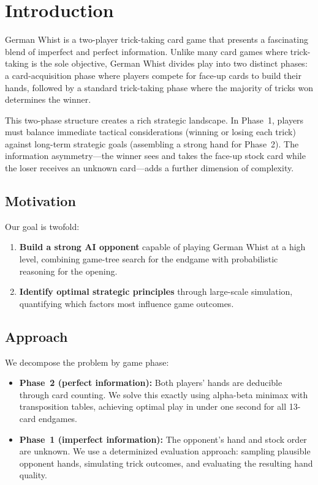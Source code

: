 \section{Introduction}
\label{sec:introduction}

German Whist is a two-player trick-taking card game that presents a fascinating
blend of imperfect and perfect information. Unlike many card games where
trick-taking is the sole objective, German Whist divides play into two distinct
phases: a card-acquisition phase where players compete for face-up cards to
build their hands, followed by a standard trick-taking phase where the majority
of tricks won determines the winner.

This two-phase structure creates a rich strategic landscape. In Phase~1, players
must balance immediate tactical considerations (winning or losing each trick)
against long-term strategic goals (assembling a strong hand for Phase~2). The
information asymmetry---the winner sees and takes the face-up stock card while
the loser receives an unknown card---adds a further dimension of complexity.

\subsection{Motivation}

Our goal is twofold:
\begin{enumerate}
  \item \textbf{Build a strong AI opponent} capable of playing German Whist at
    a high level, combining game-tree search for the endgame with probabilistic
    reasoning for the opening.
  \item \textbf{Identify optimal strategic principles} through large-scale
    simulation, quantifying which factors most influence game outcomes.
\end{enumerate}

\subsection{Approach}

We decompose the problem by game phase:

\begin{itemize}
  \item \textbf{Phase~2 (perfect information):} Both players' hands are
    deducible through card counting. We solve this exactly using alpha-beta
    minimax with transposition tables, achieving optimal play in under one
    second for all 13-card endgames.
  \item \textbf{Phase~1 (imperfect information):} The opponent's hand and stock
    order are unknown. We use a determinized evaluation approach: sampling
    plausible opponent hands, simulating trick outcomes, and evaluating the
    resulting hand quality.
\end{itemize}


